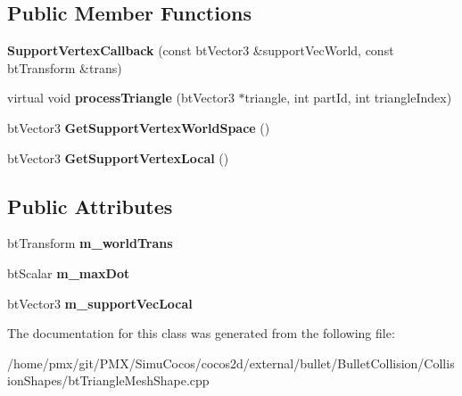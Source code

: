 \subsection*{Public Member Functions}
\begin{DoxyCompactItemize}
\item 
\mbox{\label{classSupportVertexCallback_aa6d8c80875a433428ac307754101d131}} 
{\bfseries Support\+Vertex\+Callback} (const bt\+Vector3 \&support\+Vec\+World, const bt\+Transform \&trans)
\item 
\mbox{\label{classSupportVertexCallback_af1809441df7866b9bdd8e6ed84887fdc}} 
virtual void {\bfseries process\+Triangle} (bt\+Vector3 $\ast$triangle, int part\+Id, int triangle\+Index)
\item 
\mbox{\label{classSupportVertexCallback_a3632df27980c363694810406c82f3ae7}} 
bt\+Vector3 {\bfseries Get\+Support\+Vertex\+World\+Space} ()
\item 
\mbox{\label{classSupportVertexCallback_a74402d5157a853974a49bd31cf4a9fe3}} 
bt\+Vector3 {\bfseries Get\+Support\+Vertex\+Local} ()
\end{DoxyCompactItemize}
\subsection*{Public Attributes}
\begin{DoxyCompactItemize}
\item 
\mbox{\label{classSupportVertexCallback_ad8563024933aeb1f3aafeb0c13bbe342}} 
bt\+Transform {\bfseries m\+\_\+world\+Trans}
\item 
\mbox{\label{classSupportVertexCallback_ae8a2fcb86c0ae3e4f69e162067acee4a}} 
bt\+Scalar {\bfseries m\+\_\+max\+Dot}
\item 
\mbox{\label{classSupportVertexCallback_a716db96e4e702bf7a3b1ab3f0db22f3c}} 
bt\+Vector3 {\bfseries m\+\_\+support\+Vec\+Local}
\end{DoxyCompactItemize}


The documentation for this class was generated from the following file\+:\begin{DoxyCompactItemize}
\item 
/home/pmx/git/\+P\+M\+X/\+Simu\+Cocos/cocos2d/external/bullet/\+Bullet\+Collision/\+Collision\+Shapes/bt\+Triangle\+Mesh\+Shape.\+cpp\end{DoxyCompactItemize}
